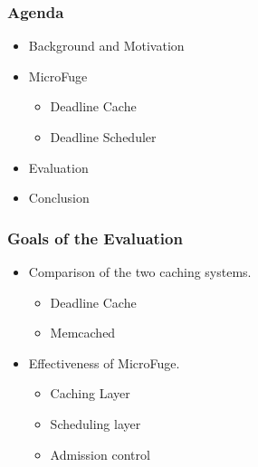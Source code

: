 \documentclass{beamer}
\begin{document}
\begin{frame}
  \frametitle{Agenda}
  \begin{itemize}
  \item[\Checkmark] Background and Motivation
  \item[\Checkmark] MicroFuge
    \begin{itemize}
    \item[\Checkmark] Deadline Cache
    \item[\Checkmark] Deadline Scheduler
    \end{itemize}
  \item Evaluation
  \item Conclusion
  \end{itemize}
\end{frame}

\begin{frame}
  \frametitle{Goals of the Evaluation}
  \begin{itemize}
  \item Comparison of the two caching systems.
    \begin{itemize}
    \item Deadline Cache
    \item Memcached
    \end{itemize}
  \item Effectiveness of MicroFuge.
    \begin{itemize}
    \item Caching Layer
    \item Scheduling layer
    \item Admission control
    \end{itemize}
  \end{itemize}
\end{frame}
\end{document}
